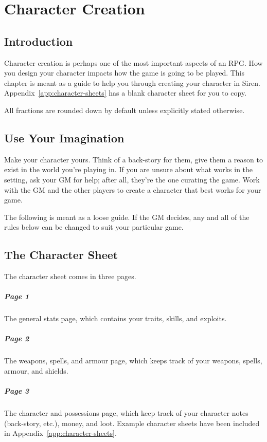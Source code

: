 \chapter{Character Creation}\label{chap:char-creat}
\section{Introduction}
Character creation is perhaps one of the most important aspects of an RPG.
How you design your character impacts how the game is going to be played.
This chapter is meant as a guide to help you through creating your character in Siren. 
Appendix~\ref{app:character-sheets} has a blank character sheet for you to copy.

\note All fractions are rounded down by default unless explicitly stated otherwise.

\section{Use Your Imagination}
Make your character yours.
Think of a back-story for them, give them a reason to exist in the world you're playing in.
If you are unsure about what works in the setting, ask your GM for help; after all, they're the one curating the game.
Work with the GM and the other players to create a character that best works for your game.

\note The following is meant as a loose guide.
If the GM decides, any and all of the rules below can be changed to suit your particular game.

\section{The Character Sheet}
The character sheet comes in three pages.
\paragraph{Page 1} The general stats page, which contains your traits, skills, and exploits.
\paragraph{Page 2} The weapons, spells, and armour page, which keeps track of your weapons, spells, armour, and shields.
\paragraph{Page 3} The character and possessions page, which keep track of your character notes (back-story, etc.), money, and loot.
Example character sheets have been included in Appendix~\ref{app:character-sheets}.

